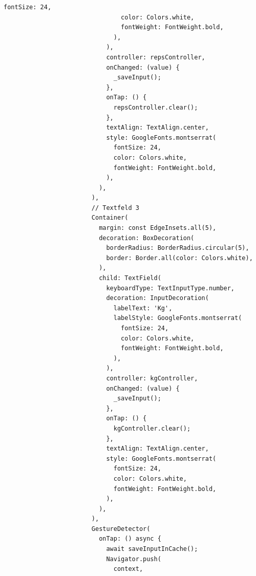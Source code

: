 \begin{lstlisting}[caption=Bearbeiten Build,label=lst:impl:frontend:qrcode]
                                fontSize: 24,
                                color: Colors.white,
                                fontWeight: FontWeight.bold,
                              ),
                            ),
                            controller: repsController,
                            onChanged: (value) {
                              _saveInput();
                            },
                            onTap: () {
                              repsController.clear();
                            },
                            textAlign: TextAlign.center,
                            style: GoogleFonts.montserrat(
                              fontSize: 24,
                              color: Colors.white,
                              fontWeight: FontWeight.bold,
                            ),
                          ),
                        ),
                        // Textfeld 3
                        Container(
                          margin: const EdgeInsets.all(5),
                          decoration: BoxDecoration(
                            borderRadius: BorderRadius.circular(5),
                            border: Border.all(color: Colors.white),
                          ),
                          child: TextField(
                            keyboardType: TextInputType.number,
                            decoration: InputDecoration(
                              labelText: 'Kg',
                              labelStyle: GoogleFonts.montserrat(
                                fontSize: 24,
                                color: Colors.white,
                                fontWeight: FontWeight.bold,
                              ),
                            ),
                            controller: kgController,
                            onChanged: (value) {
                              _saveInput();
                            },
                            onTap: () {
                              kgController.clear();
                            },
                            textAlign: TextAlign.center,
                            style: GoogleFonts.montserrat(
                              fontSize: 24,
                              color: Colors.white,
                              fontWeight: FontWeight.bold,
                            ),
                          ),
                        ),
                        GestureDetector(
                          onTap: () async {
                            await saveInputInCache();
                            Navigator.push(
                              context,

\end{lstlisting}
